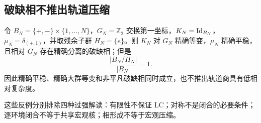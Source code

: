 \subsection{破缺相不推出轨道压缩}

\begin{counterexample}[相形成与低复杂度分离]
令 $B_N=\{+,-\}\times\{1,\ldots,N\}$，$G_N=\mathbb Z_2$ 交换第一坐标，$K_N=\operatorname{Id}_{B_N}$，$\mu_N=\delta_{(+,1)}$，并取残余子群 $H_N=\{e\}$。则 $K_N$ 对 $G_N$ 精确等变，$\mu_N$ 精确平稳，且相对 $G_N$ 存在精确分离的破缺相；但是
\[
\frac{|B_N/H_N|}{|B_N|}=1.
\]
因此精确平稳、精确大群等变和非平凡破缺相同时成立，也不推出轨道商具有低相对复杂度。
\end{counterexample}

这些反例分别排除四种过强解读：有限性不保证 LC；对称不是闭合的必要条件；逐环境闭合不等于共享宏观核；相形成不等于宏观压缩。
